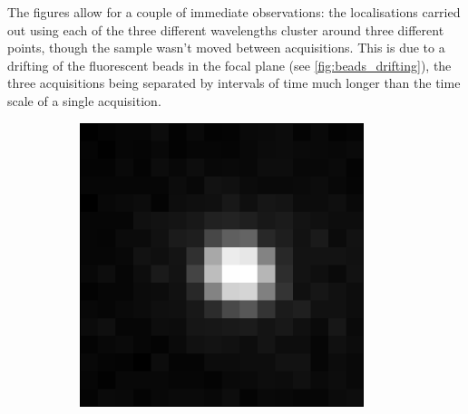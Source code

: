 The figures allow for a couple of immediate observations:
the localisations carried out using each of the three different wavelengths cluster around three different points, though the sample wasn't moved between acquisitions.
This is due to a drifting of the fluorescent beads in the focal plane (see \autoref{fig:beads_drifting}), the three acquisitions being separated by intervals of time much longer than the time scale of a single acquisition.
\begin{figure}
    \centering
    \begin{subfigure}{0.32\textwidth}
        \includegraphics[width=\textwidth]{figures/beads_drifting_647nm.pdf}
        \caption{}
        \label{fig:beads_drifting_647nm}
    \end{subfigure}
    \begin{subfigure}{0.32\textwidth}

\end{subfigure}
\end{figure}

